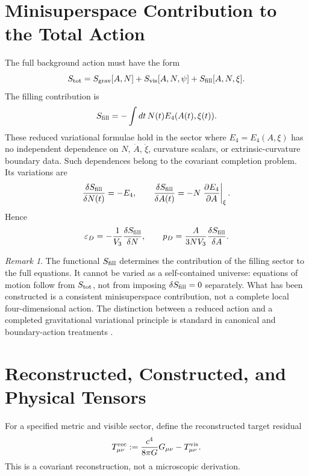 \documentclass[11pt,a4paper]{article}
\def\dd{d}%
\numberwithin{equation}{section}
\theoremstyle{remark}
\newtheorem{remark}[criterion]{Remark}
\newcommand{\Efour}{E_4}
\newcommand{\epsD}{\varepsilon_D}
\newcommand{\pD}{p_D}
\newcommand{\dd}{\mathrm{d}}
\begin{document}
\section{Minisuperspace Contribution to the Total Action}
The full background action must have the form
\begin{equation}
S_{\rm tot}=S_{\rm grav}[A,N]+S_{\rm vis}[A,N,\psi]+S_{\rm fill}[A,N,\xi].
\end{equation}
The filling contribution is
\begin{equation}
S_{\rm fill}=-\int \dd t\,N(t)\Efour(A(t),\xi(t)).
\end{equation}
These reduced variational formulae hold in the sector where \(\Efour=\Efour(A,\xi)\) has no independent dependence on \(N\), \(\dot A\), \(\dot\xi\), curvature scalars, or extrinsic-curvature boundary data. Such dependences belong to the covariant completion problem.
Its variations are
\begin{equation}
\frac{\delta S_{\rm fill}}{\delta N(t)}=-\Efour,
\qquad
\frac{\delta S_{\rm fill}}{\delta A(t)}=-N\left.\frac{\partial\Efour}{\partial A}\right|_{\xi}.
\end{equation}
Hence
\begin{equation}
\epsD=-\frac{1}{V_3}\frac{\delta S_{\rm fill}}{\delta N},
\qquad
\pD=\frac{A}{3NV_3}\frac{\delta S_{\rm fill}}{\delta A}.
\end{equation}

\begin{remark}
The functional \(S_{\rm fill}\) determines the contribution of the filling sector to the full equations. It cannot be varied as a self-contained universe: equations of motion follow from \(S_{\rm tot}\), not from imposing \(\delta S_{\rm fill}=0\) separately. What has been constructed is a consistent minisuperspace contribution, not a complete local four-dimensional action. The distinction between a reduced action and a completed gravitational variational principle is standard in canonical and boundary-action treatments \cite{DeWitt1967,GibbonsHawking1977}.
\end{remark}

\section{Reconstructed, Constructed, and Physical Tensors}
For a specified metric and visible sector, define the reconstructed target residual
\begin{equation}
T^{\rm rec}_{\mu\nu}:=\frac{c^4}{8\pi G}G_{\mu\nu}-T^{\rm vis}_{\mu\nu}.
\end{equation}
This is a covariant reconstruction, not a microscopic derivation.
\end{document}
